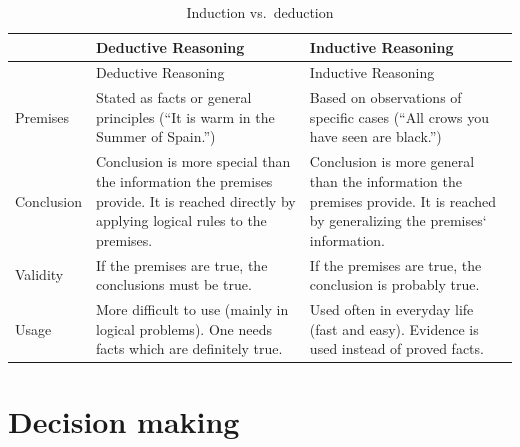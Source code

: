 \documentclass[
]{krantz}
\begin{document}
\begin{longtable}[]{@{}
  >{\raggedright\arraybackslash}p{}
  >{\raggedright\arraybackslash}p{}
  >{\raggedright\arraybackslash}p{}@{}}
\caption{\label{tab:IndDed} Induction vs.~deduction}\tabularnewline
\toprule\noalign{}
\begin{minipage}[b]{\linewidth}\raggedright
\end{minipage} & \begin{minipage}[b]{\linewidth}\raggedright
Deductive Reasoning
\end{minipage} & \begin{minipage}[b]{\linewidth}\raggedright
Inductive Reasoning
\end{minipage} \\
\midrule\noalign{}
\endfirsthead
\toprule\noalign{}
\begin{minipage}[b]{\linewidth}\raggedright
\end{minipage} & \begin{minipage}[b]{\linewidth}\raggedright
Deductive Reasoning
\end{minipage} & \begin{minipage}[b]{\linewidth}\raggedright
Inductive Reasoning
\end{minipage} \\
\midrule\noalign{}
\endhead
\bottomrule\noalign{}
\endlastfoot
Premises & Stated as facts or general principles (``It is warm in the Summer of Spain.'') & Based on observations of specific cases (``All crows you have seen are black.'') \\
Conclusion & Conclusion is more special than the information the premises provide. It is reached directly by applying logical rules to the premises. & Conclusion is more general than the information the premises provide. It is reached by generalizing the premises` information. \\
Validity & If the premises are true, the conclusions must be true. & If the premises are true, the conclusion is probably true. \\
Usage & More difficult to use (mainly in logical problems). One needs facts which are definitely true. & Used often in everyday life (fast and easy). Evidence is used instead of proved facts. \\
\end{longtable}

\section{Decision making}\label{decision-making}
\end{document}
